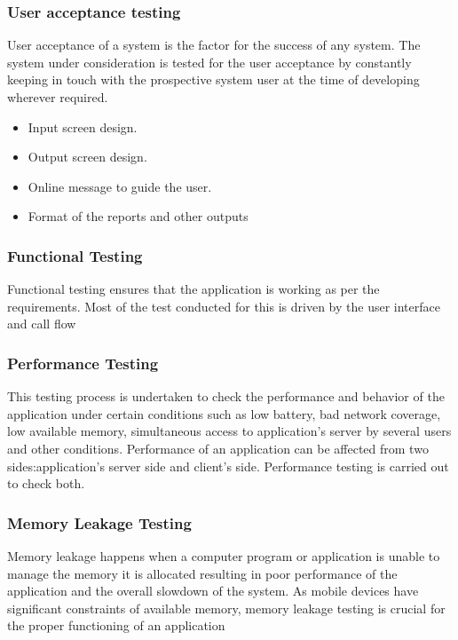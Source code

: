 \documentclass[BTech]{srmuthesis}
\begin{document}
\subsubsection{User acceptance testing}
User acceptance of a system is the factor for the success of any system. The system
under consideration is tested for the user acceptance by constantly keeping in touch
with the prospective system user at the time of developing wherever required.
\begin{itemize}
\item Input screen design.
\item Output screen design.
\item Online message to guide the user.
\item Format of the reports and other outputs
\end{itemize}
\subsubsection{Functional Testing}
Functional testing ensures that the application is working as per the requirements. Most of the test conducted for this is driven by the user interface and call flow
\subsubsection{Performance Testing}
This testing process is undertaken to check the performance and behavior of the application under certain conditions such as low battery, bad network coverage, low available memory, simultaneous access to application’s server by several users and other conditions. Performance of an application can be affected from two sides:application’s server side and client’s side. Performance testing is carried out to check both.
\subsubsection{Memory Leakage Testing}
Memory leakage happens when a computer program or application is unable to manage the memory it is allocated resulting in poor performance of the application and the overall slowdown of the system. As mobile devices have significant constraints of available memory, memory leakage testing is crucial for the proper functioning of an application
\end{document}
